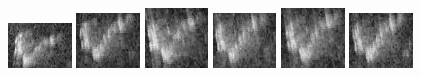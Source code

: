 \begin{figure}
    \includegraphics[width=0.15\textwidth]{chapters/images/dataset/all-class-images/hook/hook-113.jpg}
    \includegraphics[width=0.15\textwidth]{chapters/images/dataset/all-class-images/hook/hook-80.jpg}
    \includegraphics[width=0.15\textwidth]{chapters/images/dataset/all-class-images/hook/hook-70.jpg}
    \includegraphics[width=0.15\textwidth]{chapters/images/dataset/all-class-images/hook/hook-101.jpg}
    \includegraphics[width=0.15\textwidth]{chapters/images/dataset/all-class-images/hook/hook-66.jpg}
    \includegraphics[width=0.15\textwidth]{chapters/images/dataset/all-class-images/hook/hook-104.jpg}
    

\end{figure}
